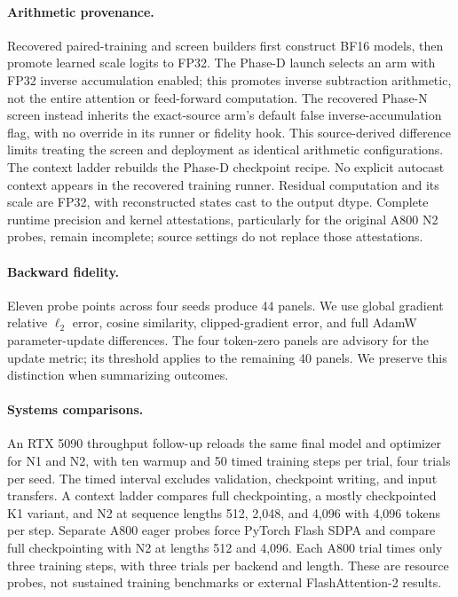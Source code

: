 \documentclass[10pt]{article}
\begin{document}
\paragraph{Arithmetic provenance.} Recovered paired-training and screen builders first construct BF16 models, then promote learned scale logits to FP32. The Phase-D launch selects an arm with FP32 inverse accumulation enabled; this promotes inverse subtraction arithmetic, not the entire attention or feed-forward computation. The recovered Phase-N screen instead inherits the exact-source arm's default false inverse-accumulation flag, with no override in its runner or fidelity hook. This source-derived difference limits treating the screen and deployment as identical arithmetic configurations. The context ladder rebuilds the Phase-D checkpoint recipe. No explicit autocast context appears in the recovered training runner. Residual computation and its scale are FP32, with reconstructed states cast to the output dtype. Complete runtime precision and kernel attestations, particularly for the original A800 N2 probes, remain incomplete; source settings do not replace those attestations.

\paragraph{Backward fidelity.} Eleven probe points across four seeds produce 44 panels. We use global gradient relative $\ell_2$ error, cosine similarity, clipped-gradient error, and full AdamW parameter-update differences. The four token-zero panels are advisory for the update metric; its threshold applies to the remaining 40 panels. We preserve this distinction when summarizing outcomes.

\paragraph{Systems comparisons.} An RTX 5090 throughput follow-up reloads the same final model and optimizer for N1 and N2, with ten warmup and 50 timed training steps per trial, four trials per seed. The timed interval excludes validation, checkpoint writing, and input transfers. A context ladder compares full checkpointing, a mostly checkpointed K1 variant, and N2 at sequence lengths 512, 2,048, and 4,096 with 4,096 tokens per step. Separate A800 eager probes force PyTorch Flash SDPA and compare full checkpointing with N2 at lengths 512 and 4,096. Each A800 trial times only three training steps, with three trials per backend and length. These are resource probes, not sustained training benchmarks or external FlashAttention-2 results.
\end{document}
